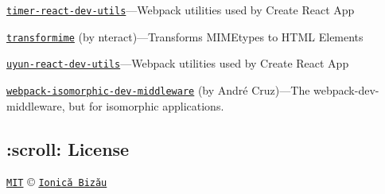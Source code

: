 \begin{DoxyItemize}
\item \href{https://github.com/facebookincubator/create-react-app#readme}{\tt {\ttfamily timer-\/react-\/dev-\/utils}}—\+Webpack utilities used by Create React App
\item \href{https://github.com/nteract/transformime#readme}{\tt {\ttfamily transformime}} (by nteract)—\+Transforms M\+I\+M\+Etypes to H\+T\+ML Elements
\item \href{https://github.com/facebookincubator/create-react-app#readme}{\tt {\ttfamily uyun-\/react-\/dev-\/utils}}—\+Webpack utilities used by Create React App
\item \href{https://github.com/moxystudio/webpack-isomorphic-dev-middleware}{\tt {\ttfamily webpack-\/isomorphic-\/dev-\/middleware}} (by André Cruz)—\+The webpack-\/dev-\/middleware, but for isomorphic applications.
\end{DoxyItemize}

\subsection*{\+:scroll\+: License}

\href{http://showalicense.com/?fullname=Ionic%C4%83%20Biz%C4%83u%20%3Cbizauionica%40gmail.com%3E%20(https%3A%2F%2Fionicabizau.net)&year=2012#license-mit}{\tt M\+IT} © \href{https://ionicabizau.net}{\tt Ionică Bizău} 